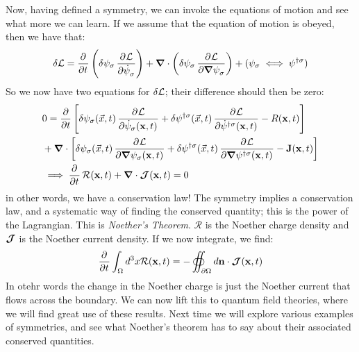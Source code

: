 Now, having defined a symmetry, we can invoke the equations of motion and see what more we can learn. If we assume that the equation of motion is obeyed, then we have that:
\begin{equation}
    \delta \L = \dpd{}{t}\left(\delta \psi_\sigma\dpd{\L}{\dot{\psi}_\sigma}\right) + \nabla \cdot \left(\delta \psi_\sigma\dpd{\L}{\nabla\psi_\sigma}\right) + (\psi_\sigma \iff \psi^{\dag\sigma})
\end{equation}
So we now have two equations for $\delta \mathcal{L}$; their difference should then be zero:
\begin{equation}
    \begin{split}
        &0=\frac{\partial}{\partial t}\left[\delta \psi_\sigma(\vec{x}, t) \dpd{\L}{\dot{\psi}_\sigma(\v{x}, t)} + \delta \psi^{\dag\sigma}(\vec{x}, t) \dpd{\L}{\dot{\psi}^{\dag\sigma}(\v{x}, t)} - R(\v{x}, t)\right] 
        \\ &+ \nabla \cdot \left[\delta \psi_\sigma(\vec{x}, t) \dpd{\L}{\nabla\psi_\sigma(\v{x}, t)} + \delta \psi^{\dag\sigma}(\vec{x}, t) \dpd{\L}{\nabla\psi^{\dag\sigma}(\v{x}, t)} - \v{J}(\v{x}, t)\right]
        \\ &\implies \dpd{}{t}\mathcal{R}(\v{x}, t) + \nabla \cdot \gv{\mathcal{J}}(\v{x}, t) = 0
    \end{split}
\end{equation}
in other words, we have a conservation law! The symmetry implies a conservation law, and a systematic way of finding the conserved quantity; this is the power of the Lagrangian. This is \emph{Noether's Theorem}. $\mathcal{R}$ is the Noether charge density and $\mbox{\boldmath$ \mathcal{J} $}$ is the Noether current density. If we now integrate, we find:
\begin{equation}
    \dpd{}{t}\int_\Omega d^3 x \mathcal{R}(\v{x}, t) = -\oiint_{\partial \Omega} d\v{n} \cdot \gv{\mathcal{J}}(\v{x}, t)
\end{equation}
In otehr words the change in the Noether charge is just the Noether current that flows across the boundary. We can now lift this to quantum field theories, where we will find great use of these results. Next time we will explore various examples of symmetries, and see what Noether's theorem has to say about their associated conserved quantities.